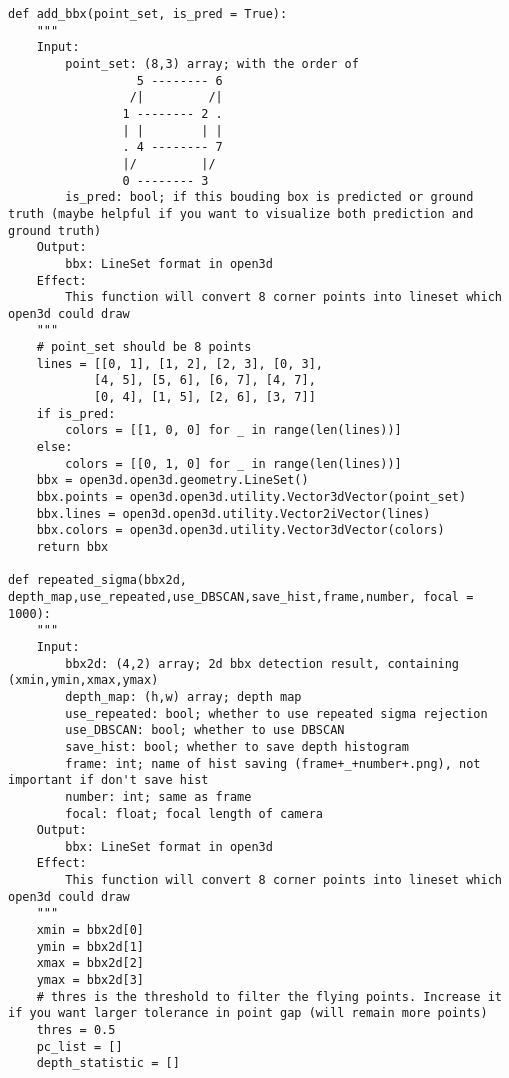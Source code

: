 \begin{lstlisting}
def add_bbx(point_set, is_pred = True):
    """
    Input:
        point_set: (8,3) array; with the order of 
                  5 -------- 6
                 /|         /|
                1 -------- 2 .
                | |        | |
                . 4 -------- 7
                |/         |/
                0 -------- 3
        is_pred: bool; if this bouding box is predicted or ground truth (maybe helpful if you want to visualize both prediction and ground truth)
    Output:
        bbx: LineSet format in open3d
    Effect:
        This function will convert 8 corner points into lineset which open3d could draw
    """
    # point_set should be 8 points
    lines = [[0, 1], [1, 2], [2, 3], [0, 3],
            [4, 5], [5, 6], [6, 7], [4, 7],
            [0, 4], [1, 5], [2, 6], [3, 7]]
    if is_pred:
        colors = [[1, 0, 0] for _ in range(len(lines))]
    else:
        colors = [[0, 1, 0] for _ in range(len(lines))]
    bbx = open3d.open3d.geometry.LineSet()
    bbx.points = open3d.open3d.utility.Vector3dVector(point_set)
    bbx.lines = open3d.open3d.utility.Vector2iVector(lines)
    bbx.colors = open3d.open3d.utility.Vector3dVector(colors)
    return bbx

def repeated_sigma(bbx2d, depth_map,use_repeated,use_DBSCAN,save_hist,frame,number, focal = 1000):
    """
    Input:
        bbx2d: (4,2) array; 2d bbx detection result, containing (xmin,ymin,xmax,ymax)
        depth_map: (h,w) array; depth map
        use_repeated: bool; whether to use repeated sigma rejection
        use_DBSCAN: bool; whether to use DBSCAN
        save_hist: bool; whether to save depth histogram
        frame: int; name of hist saving (frame+_+number+.png), not important if don't save hist
        number: int; same as frame
        focal: float; focal length of camera
    Output:
        bbx: LineSet format in open3d
    Effect:
        This function will convert 8 corner points into lineset which open3d could draw
    """
    xmin = bbx2d[0]
    ymin = bbx2d[1]
    xmax = bbx2d[2]
    ymax = bbx2d[3]
    # thres is the threshold to filter the flying points. Increase it if you want larger tolerance in point gap (will remain more points)
    thres = 0.5
    pc_list = []
    depth_statistic = []


\end{lstlisting}
